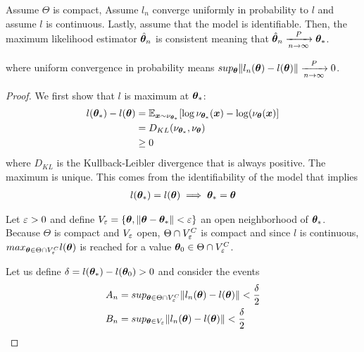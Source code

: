 \begin{proposition}
  \label{prop:mse_consistent}
  Assume $\Theta$ is compact, 
  Assume $l_n$ converge uniformly in probability to $l$
  and assume $l$ is continuous.
  Lastly, assume that the model is identifiable.
  Then, the maximum likelihood estimator  $\hat{\boldsymbol{\theta}}_n$ is consistent
  meaning that $\hat{\boldsymbol{\theta}}_n \xrightarrow[n \rightarrow \infty]{P}  \boldsymbol{\theta}_*$.
\end{proposition}
where uniform convergence in probability means $sup_{\boldsymbol{\theta}} \|l_n(\boldsymbol{\theta}) -
l(\boldsymbol{\theta})\| \xrightarrow[n \rightarrow \infty]{P} 0$.
\begin{proof}
  We first show that $l$ is maximum at $\boldsymbol{\theta}_*$:
  \begin{align}
    l(\boldsymbol{\theta}_*) - l(\boldsymbol{\theta}) &= \mathbb{E}_{\boldsymbol{x} \sim \nu_{\boldsymbol{\theta}_*}}[\log \nu_{\boldsymbol{\theta}_*}(\boldsymbol{x}) - \log(\nu_{\boldsymbol{\theta}}(\boldsymbol{x})] \\
                            &= D_{KL}(\nu_{\boldsymbol{\theta}_*}, \nu_{\boldsymbol{\theta}}) \\ \label{kl-likelihood}
                            &\geq 0
  \end{align}
  where $D_{KL}$ is the Kullback-Leibler divergence that is always positive.
  The maximum is unique. This comes from the identifiability of the model that
  implies
  \begin{align}
    l(\boldsymbol{\theta}_*) = l(\boldsymbol{\theta}) \implies \boldsymbol{\theta}_* = \boldsymbol{\theta}
  \end{align}

  Let $\varepsilon > 0$ and define $V_{\varepsilon} = \{\boldsymbol{\theta}, \|\boldsymbol{\theta} - \boldsymbol{\theta}_*\| <
  \varepsilon\}$ an open neighborhood of $\boldsymbol{\theta}_*$.
  Because $\Theta$ is compact and $V_{\varepsilon}$ open, $\Theta \cap
  V_{\varepsilon}^C$ is compact and since $l$ is continuous, $max_{\boldsymbol{\theta} \in \Theta
    \cap V_{\varepsilon}^C} l(\boldsymbol{\theta})$ is reached for a value $\boldsymbol{\theta}_0 \in \Theta \cap V_{\varepsilon}^C$.
  
  Let us define $\delta = l(\boldsymbol{\theta}_*) - l(\boldsymbol{\theta}_0) > 0$ and consider the events
  \begin{align}
    A_n &= sup_{\boldsymbol{\theta} \in \Theta \cap V_{\varepsilon}^C} \|l_n(\boldsymbol{\theta}) - l(\boldsymbol{\theta})\| < \frac{\delta}{2} \\
    B_n &= sup_{\boldsymbol{\theta} \in V_{\varepsilon}} \|l_n(\boldsymbol{\theta}) - l(\boldsymbol{\theta})\| < \frac{\delta}{2}
  \end{align}


\end{proof}
